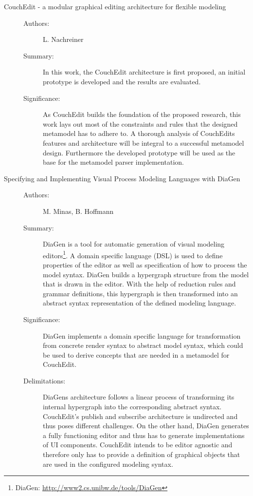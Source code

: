 \documentclass[10pt,a4paper,oneside]{scrartcl}
\begin{document}
\begin{description}
  \item[CouchEdit - a modular graphical editing architecture for flexible modeling] \cite{nachreiner_couchedit_2020}

        \begin{description}
          \item[Authors:] L. Nachreiner
          \item[Summary:] In this work, the CouchEdit architecture is first proposed, an initial prototype is developed and the results are evaluated.
          \item[Significance:] As CouchEdit builds the foundation of the proposed research, this work lays out most of the constraints and rules that the designed metamodel has to adhere to. A thorough analysis of CouchEdits features and architecture will be integral to a successful metamodel design. Furthermore the developed prototype will be used as the base for the metamodel parser implementation.

        \end{description}

  \item[Specifying and Implementing Visual Process Modeling Languages with DiaGen] \cite{minas_specifying_2001}
        \begin{description}
          \item[Authors:] M. Minas, B. Hoffmann
          \item[Summary:] DiaGen is a tool for automatic generation of visual modeling editors\footnote{DiaGen: \url{http://www2.cs.unibw.de/tools/DiaGen}}. A domain specific language (DSL) is used to define properties of the editor as well as specification of how to process the model syntax. DiaGen builds a hypergraph structure from the model that is drawn in the editor. With the help of reduction rules and grammar definitions, this hypergraph is then transformed into an abstract syntax representation of the defined modeling language.
          \item[Significance:]  DiaGen implements a domain specific language for transformation from concrete render syntax to abstract model syntax, which could be used to derive concepts that are needed in a metamodel for CouchEdit.
          \item[Delimitations:] DiaGens architecture follows a linear process of transforming its internal hypergraph into the corresponding abstract syntax. CouchEdit's publish and subscribe architecture is undirected and thus poses different challenges. On the other hand, DiaGen generates a fully functioning editor and thus has to generate implementations of UI components. CouchEdit intends to be editor agnostic and therefore only has to provide a definition of graphical objects that are used in the configured modeling syntax.


\end{description}
\end{description}
\end{document}
